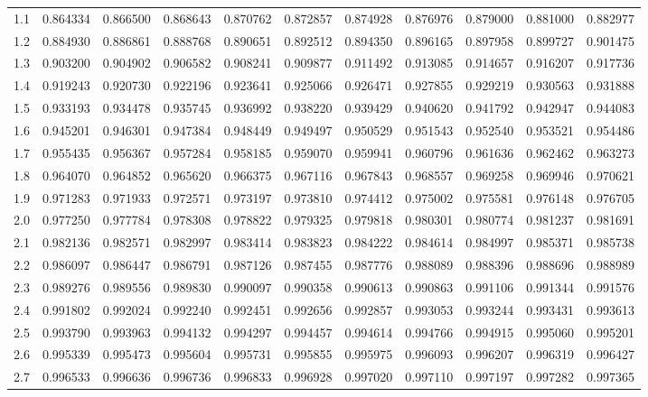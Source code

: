 \documentclass{article}
\begin{document}
\begin{center}
\begin{footnotesize}
\begin{tabular}{|r|rrrrrrrrrr|}
1.1 & 0.864334 & 0.866500 & 0.868643 & 0.870762 & 0.872857 & 0.874928 & 0.876976 & 0.879000 & 0.881000 & 0.882977 \\
1.2 & 0.884930 & 0.886861 & 0.888768 & 0.890651 & 0.892512 & 0.894350 & 0.896165 & 0.897958 & 0.899727 & 0.901475 \\
1.3 & 0.903200 & 0.904902 & 0.906582 & 0.908241 & 0.909877 & 0.911492 & 0.913085 & 0.914657 & 0.916207 & 0.917736 \\
1.4 & 0.919243 & 0.920730 & 0.922196 & 0.923641 & 0.925066 & 0.926471 & 0.927855 & 0.929219 & 0.930563 & 0.931888 \\
1.5 & 0.933193 & 0.934478 & 0.935745 & 0.936992 & 0.938220 & 0.939429 & 0.940620 & 0.941792 & 0.942947 & 0.944083 \\
1.6 & 0.945201 & 0.946301 & 0.947384 & 0.948449 & 0.949497 & 0.950529 & 0.951543 & 0.952540 & 0.953521 & 0.954486 \\
1.7 & 0.955435 & 0.956367 & 0.957284 & 0.958185 & 0.959070 & 0.959941 & 0.960796 & 0.961636 & 0.962462 & 0.963273 \\
1.8 & 0.964070 & 0.964852 & 0.965620 & 0.966375 & 0.967116 & 0.967843 & 0.968557 & 0.969258 & 0.969946 & 0.970621 \\
1.9 & 0.971283 & 0.971933 & 0.972571 & 0.973197 & 0.973810 & 0.974412 & 0.975002 & 0.975581 & 0.976148 & 0.976705 \\
2.0 & 0.977250 & 0.977784 & 0.978308 & 0.978822 & 0.979325 & 0.979818 & 0.980301 & 0.980774 & 0.981237 & 0.981691 \\
2.1 & 0.982136 & 0.982571 & 0.982997 & 0.983414 & 0.983823 & 0.984222 & 0.984614 & 0.984997 & 0.985371 & 0.985738 \\
2.2 & 0.986097 & 0.986447 & 0.986791 & 0.987126 & 0.987455 & 0.987776 & 0.988089 & 0.988396 & 0.988696 & 0.988989 \\
2.3 & 0.989276 & 0.989556 & 0.989830 & 0.990097 & 0.990358 & 0.990613 & 0.990863 & 0.991106 & 0.991344 & 0.991576 \\
2.4 & 0.991802 & 0.992024 & 0.992240 & 0.992451 & 0.992656 & 0.992857 & 0.993053 & 0.993244 & 0.993431 & 0.993613 \\
2.5 & 0.993790 & 0.993963 & 0.994132 & 0.994297 & 0.994457 & 0.994614 & 0.994766 & 0.994915 & 0.995060 & 0.995201 \\
2.6 & 0.995339 & 0.995473 & 0.995604 & 0.995731 & 0.995855 & 0.995975 & 0.996093 & 0.996207 & 0.996319 & 0.996427 \\
2.7 & 0.996533 & 0.996636 & 0.996736 & 0.996833 & 0.996928 & 0.997020 & 0.997110 & 0.997197 & 0.997282 & 0.997365 \\

\end{tabular}
\end{footnotesize}
\end{center}
\end{document}
